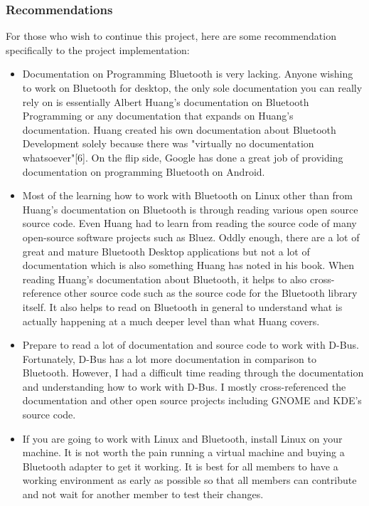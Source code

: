 \documentclass[letterpaper,twocolumn,10pt]{article}
\begin{document}
{{\subsubsection{Recommendations}

For those who wish to continue this project, here are some recommendation specifically to the project implementation:
\begin{singlespacing}
\begin{itemize}
\item Documentation on Programming Bluetooth is very lacking. Anyone wishing to work on Bluetooth for desktop, the only sole documentation you can really rely on is essentially Albert Huang's documentation on Bluetooth Programming or any documentation that expands on Huang's documentation. Huang created his own documentation about Bluetooth Development solely because there was "virtually no documentation whatsoever"[6]. On the flip side, Google has done a great job of providing documentation on programming Bluetooth on Android.

\item Most of the learning how to work with Bluetooth on Linux other than from Huang's documentation on Bluetooth is through reading various open source source code. Even Huang had to learn from reading the source code of many open-source software projects such as Bluez. Oddly enough, there are a lot of great and mature Bluetooth Desktop applications but not a lot of documentation which is also something Huang has noted in his book. When reading Huang's documentation about Bluetooth, it helps to also cross-reference other source code such as the source code for the Bluetooth library itself. It also helps to read on Bluetooth in general to understand what is actually happening at a much deeper level than what Huang covers.

\item Prepare to read a lot of documentation and source code to work with D-Bus. Fortunately, D-Bus has a lot more documentation in comparison to Bluetooth. However, I had a difficult time reading through the documentation and understanding how to work with D-Bus. I mostly cross-referenced the documentation and other open source projects including GNOME and KDE's source code.

\item If you are going to work with Linux and Bluetooth, install Linux on your machine. It is not worth the pain running a virtual machine and buying a Bluetooth adapter to get it working. It is best for all members to have a working environment as early as possible so that all members can contribute and not wait for another member to test their changes.


\end{itemize}
\end{singlespacing}}}
\end{document}

